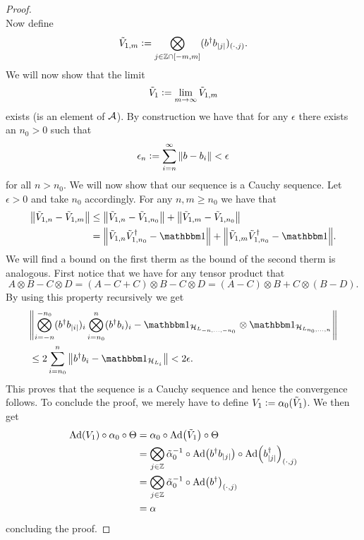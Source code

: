 \documentclass[12pt,a4paper,twoside]{article}
\numberwithin{equation}{section}
\begin{document}
\begin{proof}
\begin{equation}
	\end{equation}
	Now define
	\begin{equation}
		\tilde V_{1,m}\defeq\bigotimes_{j\in\ZZ\cap[-m,m]}(b^\dagger b_\abs{j})_{(\cdot,j)}.
	\end{equation}
	We will now show that the limit
	\begin{equation}
		\tilde V_1\defeq\lim_{m\rightarrow\infty}\tilde V_{1,m}
	\end{equation}
	exists (is an element of $\AA$). By construction we have that for any $\epsilon$ there exists an $n_0>0$ such that
	\begin{equation}
		\epsilon_n\defeq\sum_{i=n}^\infty\norm{b-b_i}<\epsilon
	\end{equation}
	for all $n>n_0$. We will now show that our sequence is a Cauchy sequence. Let $\epsilon>0$ and take $n_0$ accordingly. For any $n,m\geq n_0$ we have that
	\begin{align}
		\norm{\tilde{V}_{1,n}-\tilde{V}_{1,m}}&\leq \norm{\tilde{V}_{1,n}-\tilde{V}_{1,n_0}}+\norm{\tilde{V}_{1,m}-\tilde{V}_{1,n_0}}\\
		&=\norm{\tilde{V}_{1,n}\tilde{V}_{1,n_0}^\dagger-\id}+\norm{\tilde{V}_{1,m}\tilde{V}_{1,n_0}^\dagger-\id}.
	\end{align}
	We will find a bound on the first therm as the bound of the second therm is analogous. First notice that we have for any tensor product that
	\begin{equation}
		A\otimes B-C\otimes D=(A-C+C)\otimes B-C\otimes D=(A-C)\otimes B+C\otimes (B-D).
	\end{equation}
	By using this property recursively we get
	\begin{align}
	&\norm{\bigotimes_{i=-n}^{-n_0}(b^\dagger b_\abs{i})_i\bigotimes_{i=n_0}^{n}(b^\dagger b_i)_i-\id_{\HH_{L_{-n,\ldots,-n_0}}}\otimes\id_{\HH_{L_{n_0,\ldots,n}}}}\\
	&\leq 2\sum_{i=n_0}^{n}\norm{b^\dagger b_i-\id_{\HH_{L_i}}}<2\epsilon.
	\end{align}
	This proves that the sequence is a Cauchy sequence and hence the convergence follows. To conclude the proof, we merely have to define $V_1\defeq \alpha_0(\tilde{V}_1)$. We then get
	\begin{align}
		\Ad{V_1}\circ \alpha_0\circ \Theta&= \alpha_0\circ\Ad{\tilde V_1}\circ \Theta\\
		&=\bigotimes_{j\in\ZZ}\tilde\alpha_0^{-1}\circ\Ad{b^\dagger b_\abs{j}}\circ \Ad{b_\abs{j}^\dagger}_{(\cdot,j)}\\
		&=\bigotimes_{j\in\ZZ}\tilde\alpha_0^{-1}\circ\Ad{b^\dagger}_{(\cdot,j)}\\
		&=\alpha
	\end{align}
	concluding the proof.
\end{proof}
\end{document}
